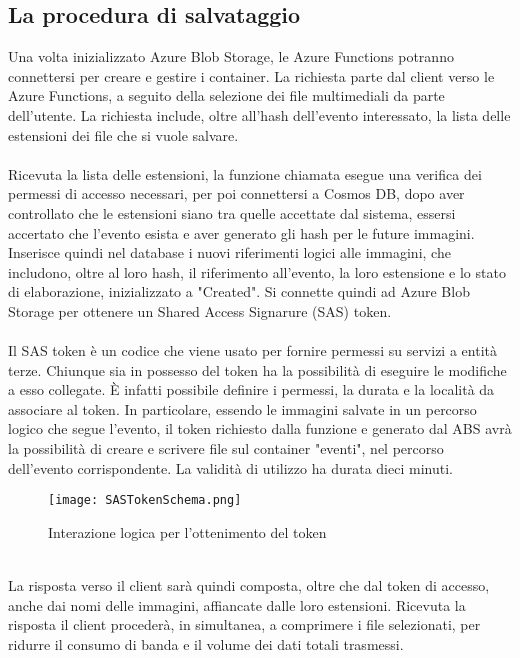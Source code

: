 \subsection{La procedura di salvataggio}

Una volta inizializzato Azure Blob Storage, le Azure Functions potranno connettersi per 
creare e gestire i container.
La richiesta parte dal client verso le Azure Functions, 
a seguito della selezione dei file multimediali da parte dell'utente.
La richiesta include, oltre all'hash dell'evento interessato, la lista delle estensioni dei file che si vuole salvare.\\
\\
Ricevuta la lista delle estensioni, 
la funzione chiamata esegue una verifica dei permessi di accesso necessari,
per poi connettersi a Cosmos DB, 
dopo aver controllato che le estensioni siano tra quelle accettate dal sistema,
essersi accertato che l'evento esista e aver generato gli hash per le future immagini.
Inserisce quindi nel database i nuovi riferimenti logici alle immagini,
che includono, oltre al loro hash, il riferimento all'evento, la loro estensione
e lo stato di elaborazione, inizializzato a "Created".
Si connette quindi ad Azure Blob Storage per ottenere un Shared Access Signarure (SAS) token.\\
\\
Il SAS token è un codice che viene usato per fornire permessi su servizi a entità terze.
Chiunque sia in possesso del token ha la possibilità di eseguire le modifiche a esso collegate. 
È infatti possibile definire i permessi, la durata e la località da associare al token.
In particolare, essendo le immagini salvate in un percorso logico che segue l'evento,
il token richiesto dalla funzione e generato dal ABS 
avrà la possibilità di creare e scrivere file sul container "eventi", 
nel percorso dell'evento corrispondente.
La validità di utilizzo ha durata dieci minuti.\\
\begin{figure}[h!]
    \centering
    \texttt{[image: SASTokenSchema.png]}
    \caption{Interazione logica per l'ottenimento del token}
\end{figure}
\\
La risposta verso il client sarà quindi composta, oltre che dal token di accesso, 
anche dai nomi delle immagini, affiancate dalle loro estensioni.
Ricevuta la risposta il client procederà, in simultanea, 
a comprimere i file selezionati, 
per ridurre il consumo di banda e il volume dei dati totali trasmessi.

